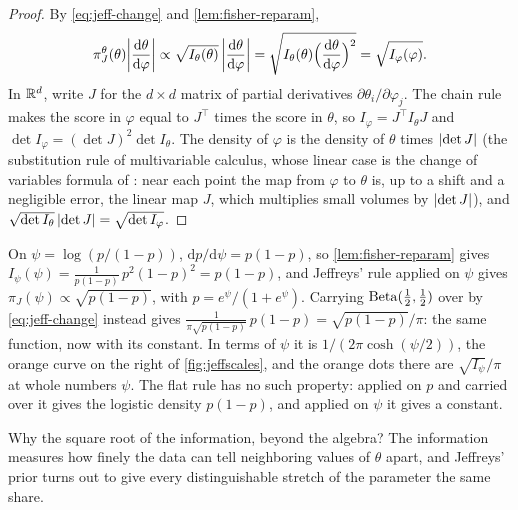 \begin{proof}
By \cref{eq:jeff-change} and \cref{lem:fisher-reparam},
\[
\pi_J^\theta(\theta)\abs*{\frac{\mathrm{d}\theta}{\mathrm{d}\varphi}} \propto \sqrt{I_\theta(\theta)}\,\abs*{\frac{\mathrm{d}\theta}{\mathrm{d}\varphi}} = \sqrt{I_\theta(\theta)\Big(\frac{\mathrm{d}\theta}{\mathrm{d}\varphi}\Big)^2} = \sqrt{I_\varphi(\varphi)}.
\]
In $\mathbb{R}^d$, write $J$ for the $d \times d$ matrix of partial derivatives $\partial\theta_i/\partial\varphi_j$. The chain rule makes the score in $\varphi$ equal to $J^\top$ times the score in $\theta$, so $I_\varphi = J^\top I_\theta J$ and $\det I_\varphi = (\det J)^2\det I_\theta$. The density of $\varphi$ is the density of $\theta$ times $\lvert\det J\rvert$ (the substitution rule of multivariable calculus, whose linear case is the change of variables formula of : near each point the map from $\varphi$ to $\theta$ is, up to a shift and a negligible error, the linear map $J$, which multiplies small volumes by $\lvert\det J\rvert$), and $\sqrt{\det I_\theta}\,\lvert\det J\rvert = \sqrt{\det I_\varphi}$.
\end{proof}

\begin{worked}
On $\psi = \log(p/(1-p))$, $\mathrm{d}p/\mathrm{d}\psi = p(1-p)$, so \cref{lem:fisher-reparam} gives $I_\psi(\psi) = \frac{1}{p(1-p)}\,p^2(1-p)^2 = p(1-p)$, and Jeffreys' rule applied on $\psi$ gives $\pi_J(\psi) \propto \sqrt{p(1-p)}$, with $p = e^\psi/(1 + e^\psi)$.
Carrying $\mathrm{Beta}(\frac12, \frac12)$ over by \cref{eq:jeff-change} instead gives $\frac{1}{\pi\sqrt{p(1-p)}}\,p(1-p) = \sqrt{p(1-p)}/\pi$: the same function, now with its constant.
In terms of $\psi$ it is $1/(2\pi\cosh(\psi/2))$, the orange curve on the right of \cref{fig:jeffscales}, and the orange dots there are $\sqrt{I_\psi}/\pi$ at whole numbers $\psi$.
The flat rule has no such property: applied on $p$ and carried over it gives the logistic density $p(1-p)$, and applied on $\psi$ it gives a constant.
\end{worked}

Why the square root of the information, beyond the algebra?
The information measures how finely the data can tell neighboring values of $\theta$ apart, and Jeffreys' prior turns out to give every distinguishable stretch of the parameter the same share.

